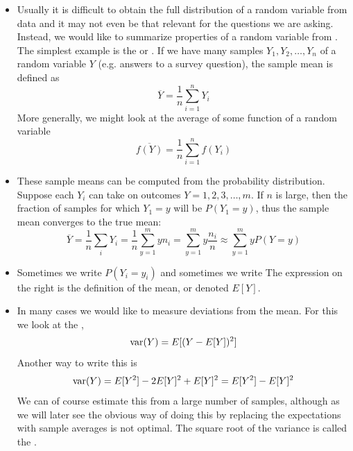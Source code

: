 \begin{itemize}
\item Usually it is difficult to obtain the full distribution of a random variable from data and it may not even be that relevant for the questions we are asking. Instead, we would like to summarize properties of a random variable from . The simplest example is the  or . 
If we have many samples $Y_1,Y_2,\dots,Y_n$ of a random variable $Y$ (e.g. answers to a survey question), the sample mean is defined as
\begin{equation*}
\overline{Y} = \frac{1}{n}\sum_{i=1}^nY_i
\end{equation*}
More generally, we might look at the average of some function of a random variable 
\begin{equation*}
\overline{f(Y)} = \frac{1}{n}\sum_{i=1}^nf(Y_i)
\end{equation*}
\item  These sample means can be computed from the probability distribution.  Suppose each $Y_i$ can take on outcomes $Y = 1,2,3,\dots,m$. If $n$ is large, then the fraction of samples for which $Y_1= y$ will be $P(Y_1=y)$, thus the sample mean converges to the true mean: 
 \begin{equation*}
\overline{Y} =  \frac{1}{n}\sum_{i}Y_i = \frac{1}{n} \sum_{y=1}^m y n_i=\sum_{y=1}^m y \frac{n_i }{n}\approx  \sum_{y=1}^m y P(Y=y)
\end{equation*}
\item Sometimes we write $P(Y_i = y_i)$ and sometimes we write 
The expression on the right is the definition of the mean, or  denoted $E[Y]$.
\item In many cases we would like to measure deviations from the mean. For this we look at the ,
\begin{equation*}
{\rm var}(Y) = E[(Y-E[Y])^2]
\end{equation*}
Another way to write this is 
\begin{equation*}
 {\rm var}(Y) = E[Y^2] - 2E[Y]^2 + E[Y]^2 = E[Y^2]-E[Y]^2
\end{equation*}
We can of course estimate this from a large number of samples, although as we will later see the obvious way of doing this by replacing the expectations with sample averages is not optimal. The square root of the variance is called the . 


\end{itemize}
